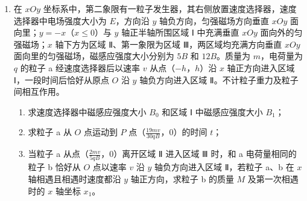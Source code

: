 \documentclass[\gkver]{gaokaozhenti}
\begin{document}
\begin{enumerate}
\item
在 $xOy$ 坐标系中，第二象限有一粒子发生器，其右侧放置速度选择器，速度选择器中电场强度大小为 $E$，方向沿 $y$ 轴负方向，匀强磁场方向垂直 $xOy$ 面向里；$y = -x$（$x \leq 0$）与 $y$ 轴正半轴所围区域 Ⅰ 中充满垂直 $xOy$ 面向外的匀强磁场；$x$ 轴下方为区域 Ⅱ、第一象限为区域 Ⅲ，两区域均充满方向垂直 $xOy$ 面向里的匀强磁场，磁感应强度大小分别为 $5B$ 和 $12B$。质量为 $m$，电荷量为 $q$ 的粒子 a 经速度选择器后以速率 $v$ 从点（$-h$，$h$）沿 $x$ 轴正方向进入区域 Ⅰ，一段时间后恰好从原点 $O$ 沿 $y$ 轴负方向进入区域 Ⅱ。不计粒子重力及粒子间相互作用。
\begin{enumerate}
	\item
	求速度选择器中磁感应强度大小 $B_{0}$ 和区域 Ⅰ 中磁感应强度大小 $B_{1}$；
	\item
	求粒子 a 从 $O$ 点运动到 $P$ 点（$\frac{19mv}{30qB}$，0）的时间 $t$；
	\item
	当粒子 a 从点（$\frac{2mv}{5qB}$，0）离开区域 Ⅱ 进入区域 Ⅲ 时，和 a 电荷量相同的粒子 b 恰好从 $O$ 点以速率 $v$ 沿 $y$ 轴负方向进入区域 Ⅱ，若粒子 a、b 在 $x$ 轴相遇且相遇时速度都沿 $y$ 轴正方向，求粒子 b 的质量 $M$ 及第一次相遇时的 $x$ 轴坐标 $x_{1}$。
\end{enumerate}
\onepicture[w=8cm, align=right]{}
\end{enumerate}
\end{document}
